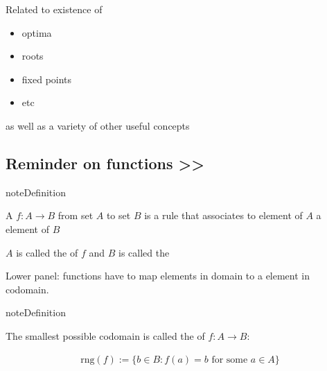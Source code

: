 \documentclass[letterpaper,10pt,english]{jupyterBook}
\begin{document}
\sphinxAtStartPar
Related to existence of
\begin{itemize}
\item {} 
\sphinxAtStartPar
optima

\item {} 
\sphinxAtStartPar
roots

\item {} 
\sphinxAtStartPar
fixed points

\item {} 
\sphinxAtStartPar
etc

\end{itemize}

\sphinxAtStartPar
as well as a variety of other useful concepts


\subsection{Reminder on functions >>}
\label{\detokenize{06.optimization_fundamentals:reminder-on-functions}}
\begin{sphinxadmonition}{note}{Definition}

\sphinxAtStartPar
A  \(f \colon A \rightarrow B\) from set \(A\) to set \(B\) is a rule that
associates to  element of \(A\) a  element of \(B\)
\end{sphinxadmonition}

\begin{figure}[htbp]
\centering

\noindent{}
\end{figure}

\sphinxAtStartPar
\(A\) is called the  of \(f\) and \(B\) is called the 

\begin{figure}[htbp]
\centering

\noindent{}
\end{figure}

\sphinxAtStartPar
Lower panel: functions have to map  elements in domain to a  element in codomain.

\begin{sphinxadmonition}{note}{Definition}

\sphinxAtStartPar
The smallest possible codomain is called the  of \(f \colon A \to B\):
\end{sphinxadmonition}
\begin{equation*}
\begin{split}
%
\mathrm{rng}(f) := \{ b \in B : f(a) = b \text{ for some } a \in A \} 
%
\end{split}
\end{equation*}
\begin{figure}[htbp]
\centering

\noindent{}
\end{figure}
\end{document}
